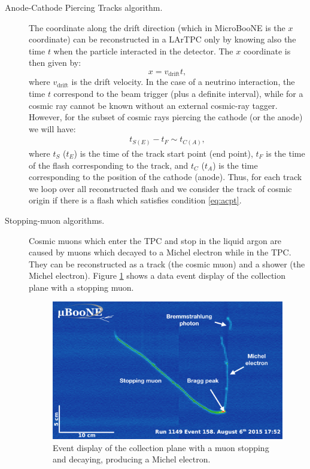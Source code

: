\begin{description}
\item[Anode-Cathode Piercing Tracks algorithm.] The coordinate along the drift direction (which in MicroBooNE is the $x$ coordinate) can be reconstructed in a LArTPC only by knowing also the time $t$ when the particle interacted in the detector. The $x$ coordinate is then given by:
\begin{equation}
    x = v_{\mathrm{drift}}t,
\end{equation}
where $v_{\mathrm{drift}}$ is the drift velocity. In the case of a neutrino interaction, the time $t$ correspond to the beam trigger (plus a definite interval), while for a cosmic ray cannot be known without an external cosmic-ray tagger.
However, for the subset of cosmic rays piercing the cathode (or the anode) we will have:
\begin{align}
    t_{S(E)} - t_F \sim t_{C(A)},\label{eq:acpt}
\end{align}
where $t_S$ ($t_E$) is the time of the track start point (end point), $t_F$ is the time of the flash corresponding to the track, and $t_C$ ($t_A$) is the time corresponding to the position of the cathode (anode). Thus, for each track we loop over all reconstructed flash and we consider the track of cosmic origin if there is a flash which satisfies condition \ref{eq:acpt}.

\item[Stopping-muon algorithms.] Cosmic muons which enter the TPC and stop in the liquid argon are caused by muons which decayed to a Michel electron while in the TPC. They can be reconstructed as a track (the cosmic muon) and a shower (the Michel electron). Figure \ref{fig:michel_evd} shows a data event display of the collection plane with a stopping muon.

\begin{figure}[htbp]
\centering
  \includegraphics[width=0.75\linewidth]{figures/michel_evd.png}
  \caption{Event display of the collection plane with a muon stopping and decaying, producing a Michel electron. }
  \label{fig:michel_evd}
\end{figure}


\end{description}
